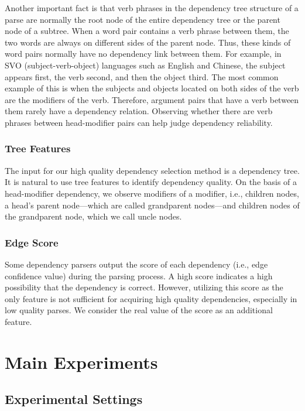 \documentclass[english]{jnlp_1.4}
\begin{document}
Another important fact is that verb phrases in the dependency tree structure of a
parse are normally the root node of the entire dependency tree or the parent node of
a subtree. When a word pair contains a verb phrase between them,
the two words are always on different sides of the parent node. Thus,
these kinds of word pairs normally have no dependency link between them. 
For example, in SVO (subject-verb-object) languages such as English and Chinese, the subject
appears first, the verb second, and then the object third.
The most common example of this is when the subjects and objects located on both sides of the
verb are the modifiers of the verb. Therefore, argument pairs that have a verb 
between them rarely have a dependency relation. Observing whether
there are verb phrases between head-modifier pairs can help judge
dependency reliability.


\subsubsection{Tree Features }

The input for our high quality dependency selection method is a dependency tree. It is natural to use tree
features to identify dependency quality.
On the basis of a head-modifier dependency, we observe modifiers of a modifier, i.e., children nodes, 
a head's parent node---which are called grandparent nodes---and children nodes of the grandparent node, which we call uncle nodes.


\subsubsection{Edge Score }

Some dependency parsers output the score of each dependency (i.e., edge confidence value) during the parsing process.
A high score indicates a high possibility that the dependency is correct.
However, utilizing this score as the only feature is not sufficient for acquiring high quality dependencies, especially in low quality parses.
We consider the real value of the score as an additional feature.


\section{Main Experiments}\label{subsec-construction}\label{exp}

\subsection{Experimental Settings}
\end{document}
